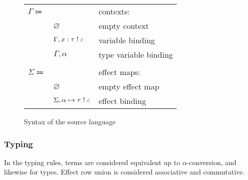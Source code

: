 \documentclass[12pt]{article}
\newcommand\anno[2]{#1 : #2}
\newcommand\eVar{x}
\newcommand\type{\tau}
\newcommand\tVar{\alpha}
\newcommand\tEmbellished[2]{#1 \; ! \; \colorRow{#2}}
\newcommand\colorRow[1]{\textcolor{violet}{#1}}
\newcommand\row{\varepsilon}
\newcommand\context{\Gamma}
\newcommand\cEmpty{\varnothing}
\newcommand\cTExtend[4]{#1, \anno{#2}{\tEmbellished{#3}{#4}}}
\newcommand\cKExtend[2]{#1, #2}
\newcommand\effectMap{\Sigma}
\newcommand\emEmpty{\varnothing}
\newcommand\emExtend[4]{#1, #2 \mapsto \tEmbellished{#3}{#4}}
\begin{document}
\begin{figure}[H]
\begin{mdframed}[backgroundcolor=none]
\begin{center}
\begin{tabular}{l l l}
                \\
                $\context \Coloneqq$ & & contexts: \\
                & $\cEmpty$ & empty context \\
                & $\cTExtend{\context}{\eVar}{\type}{\row}$ & variable binding \\
                & $\cKExtend{\context}{\tVar}$ & type variable binding \\
                \\
                $\effectMap \Coloneqq$ & & effect maps: \\
                & $\emEmpty$ & empty effect map \\
                & $\emExtend{\effectMap}{\tVar}{\type}{\row}$ & effect binding \\
              \end{tabular}
            \end{center}

            \caption{Syntax of the source language}\label{fig:source_syntax}
          \end{mdframed}
        \end{figure}

      \subsubsection{Typing}
        In the typing rules, terms are considered equivalent up to $\alpha$-conversion, and likewise for types. Effect row union is considered associative and commutative.
\end{document}
